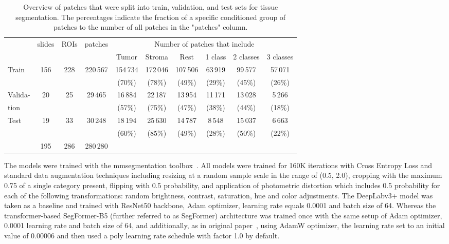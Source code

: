 \begin{table}[h!]
    \centering
    \begin{tabular}{ l c c c c c c c c c}
        \hline
        & \multirow{2}{*}{slides} & \multirow{2}{*}{ROIs}& \multirow{2}{*}{patches}& \multicolumn{6}{c}{Number of patches that include}\\ 
        \cline{5-10}
        & & & & Tumor & Stroma & Rest & 1 class & 2 classes & 3 classes\\
        \hline
        Train & 156 & 228 & 220\,567 & 154\,734 & 172\,046 & 107\,506 & 63\,919 & 99\,577 & 57\,071 \\
         &  &  &  & (70\%) & (78\%) & (49\%) & (29\%) & (45\%) & (26\%) \\
        Valida- & 20 & 25 & 29\,465 & 16\,884 & 22\,187 & 13\,954 & 11\,171 & 13\,028 & 5\,266 \\
        tion &  &  &  & (57\%) & (75\%) & (47\%) & (38\%) & (44\%) & (18\%)\\
        Test & 19 & 33 & 30\,248 & 18\,194 & 25\,630 & 14\,787 & 8\,548 & 15\,037 & 6\,663\\
         &  &  &  & (60\%) & (85\%) & (49\%) & (28\%) & (50\%) & (22\%)\\
        \hline
        & 195 & 286 & 280\,280 &  &  &  & & & \\
    \end{tabular}
    \caption{\label{tab:patch_sep} Overview of patches that were split into train, validation,
    and test sets for tissue segmentation. The percentages indicate the fraction of a specific conditioned group of patches to the number of all patches in the "patches" column.}
\end{table}

The models were trained with the mmsegmentation toolbox~\cite{mmseg2020}. 
All models were trained for 160K iterations with Cross Entropy Loss and
standard data augmentation techniques including resizing at a random sample scale in the range
of (0.5, 2.0), cropping with the maximum 0.75 of a single category present, flipping with 0.5 probability,
and application of photometric distortion which includes 0.5 probability for each of the following transformations: random brightness, contrast, saturation, hue and color adjustments. 
The DeepLabv3+ model was taken as a baseline and trained with ResNet50 backbone,
Adam optimizer, learning rate equals 0.0001 and batch size of 64. Whereas the
transformer-based SegFormer-B5 (further referred to as SegFormer) architecture was trained once with the same setup of
Adam optimizer, 0.0001 learning rate and batch size of 64, and additionally, as 
in original paper~\cite*{xie2021segformer}, using AdamW optimizer, the learning rate
set to an initial value of 0.00006 and then used a poly learning rate schedule with
factor 1.0 by default.

